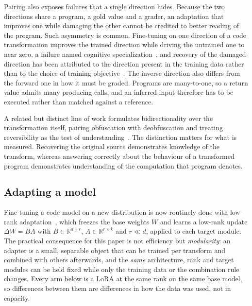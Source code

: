 Pairing also exposes failures that a single direction hides. Because the two directions
share a program, a gold value and a grader, an adaptation that improves one while damaging
the other cannot be credited to better reading of the program. Such asymmetry is common.
Fine-tuning on one direction of a code transformation improves the trained direction while
driving the untrained one to near zero, a failure named cognitive
specialization~\cite{cft_bidirectional}, and recovery of the damaged direction has been
attributed to the direction present in the training data rather than to the choice of
training objective~\cite{paired_attrib}. The inverse direction also differs from the forward
one in how it must be graded. Programs are many-to-one, so a return value admits many
producing calls, and an inferred input therefore has to be executed rather than matched
against a reference.

A related but distinct line of work formulates bidirectionality over the transformation
itself, pairing obfuscation with deobfuscation and treating reversibility as the test of
understanding~\cite{cft_bidirectional}. The distinction matters for what is measured.
Recovering the original source demonstrates knowledge of the transform, whereas answering
correctly about the behaviour of a transformed program demonstrates understanding of the
computation that program denotes.

\subsection{Adapting a model}
Fine-tuning a code model on a new distribution is now routinely done with low-rank
adaptation~\cite{lora}, which freezes the base weights $W$ and learns a low-rank update $\Delta W =
BA$ with $B \in \mathbb{R}^{d \times r}$, $A \in \mathbb{R}^{r \times k}$ and $r \ll d$, applied to
each target module. The practical consequence for this paper is not efficiency but
\emph{modularity}: an adapter is a small, separable object that can be trained per transform and
combined with others afterwards, and the \emph{same} architecture, rank and target modules can be
held fixed while only the training data or the combination rule changes. Every arm below is a LoRA
at the same rank on the same base model, so differences between them are differences in how the data
was used, not in capacity.


